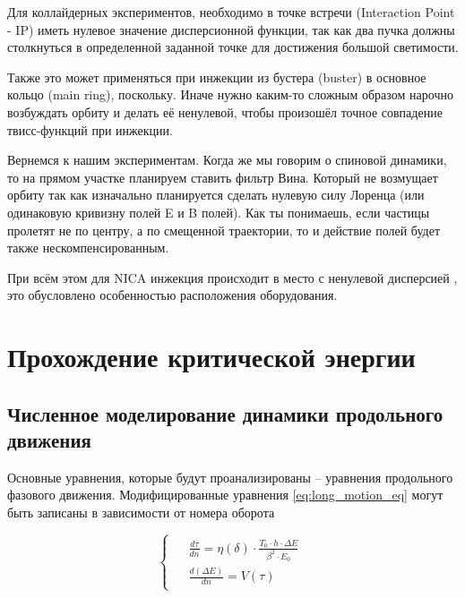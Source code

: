 \par Для коллайдерных экспериментов, необходимо в точке встречи (Interaction Point - IP) иметь нулевое значение дисперсионной функции, так как два пучка должны столкнуться в определенной заданной точке для достижения большой светимости.

\par Также это может применяться при инжекции из бустера (buster) в основное кольцо (main ring), поскольку. Иначе нужно каким-то сложным образом нарочно возбуждать орбиту и делать её ненулевой, чтобы произошёл точное совпадение твисс-функций при инжекции. 

\par Вернемся к нашим экспериментам. Когда же мы говорим о спиновой динамики, то на прямом участке планируем ставить фильтр Вина. Который не возмущает орбиту так как изначально планируется сделать нулевую силу Лоренца (или одинаковую кривизну полей E и B полей). Как ты понимаешь, если частицы пролетят не по центру, а по смещенной траектории, то и действие полей будет также нескомпенсированным.

\par При всём этом для NICA инжекция происходит в место с ненулевой дисперсией , это обусловлено особенностью расположения оборудования.
	
	\section{Прохождение критической энергии}\label{sec:transition_jump/U-70}
	
	\subsection{Численное моделирование динамики продольного движения} \label{sec:transition_jump/modeling}
	
\par Основные уравнения, которые будут проанализированы – уравнения продольного фазового движения.
Модифицированные уравнения \ref{eq:long_motion_eq} могут быть записаны в зависимости от номера оборота
	
\begin{equation}
\begin{cases}
\begin{aligned}
& \frac{d \tau}{d n}=\eta(\delta) \cdot \frac{T_{0} \cdot h  \cdot \Delta E}{\beta^2 \cdot E_0} \\
& \frac{d(\Delta E)}{d n}=V(\tau)
\end{aligned}
\end{cases}
\label{eq:long_motion_eq}
\end{equation}	


